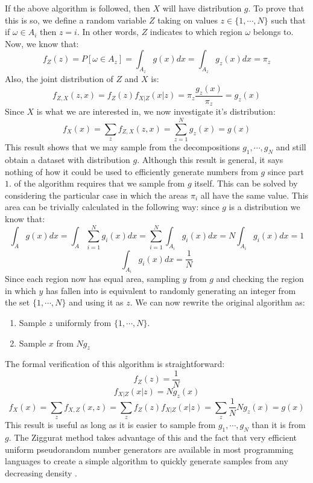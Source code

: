 \documentclass[11pt,onecolumn]{article}
\begin{document}
If the above algorithm is followed, then $X$ will have distribution $g$. To prove that this is so, we define a random variable $Z$ taking on values $z\in\{1,\dotsb,N\}$ such that if $\omega\in A_i$ then $z=i$. In other words, $Z$ indicates to which region $\omega$ belongs to. Now, we know that:
$$f_Z(z)=P[\omega\in A_z]=\int_{A_z} g(x)dx=\int_{A_z} g_z(x)dx=\pi_z$$
Also, the joint distribution of $Z$ and $X$ is:
$$f_{Z,X}(z,x)=f_Z(z)f_{X|Z}(x|z)=\pi_z\frac{g_z(x)}{\pi_z}=g_z(x)$$
Since $X$ is what we are interested in, we now investigate it's distribution:
$$f_X(x)=\sum_z f_{Z,X}(z,x)=\sum_{z=1}^N g_z(x)=g(x)$$ 
This result shows that we may sample from the decompositions $g_1,\dotsb,g_N$ and still obtain a dataset with distribution $g$. Although this result is general, it says nothing of how it could be used to efficiently generate numbers from $g$ since part $1.$ of the algorithm requires that we sample from $g$ itself. This can be solved by considering the particular case in which the areas $\pi_i$ all have the same value. This area can be trivially calculated in the following way: since $g$ is a distribution we know that:
$$\int_A g(x)dx=\int_A \sum_{i=1}^N g_i(x)dx=\sum_{i=1}^N \int_{A_i} g_i(x)dx=N\int_{A_i} g_i(x)dx=1$$
$$\int_{A_i} g_i(x)dx=\frac{1}{N}$$
Since each region now has equal area, sampling $y$ from $g$ and checking the region in which $y$ has fallen into is equivalent to randomly generating an integer from the set $\{1,\dotsb,N\}$ and using it as $z$. We can now rewrite the original algorithm as:
\begin{enumerate}
	\item Sample $z$ uniformly from $\{1,\dotsb,N\}$.
	\item Sample $x$ from $Ng_z$
\end{enumerate}
The formal verification of this algorithm is straightforward:
$$f_Z(z)=\frac{1}{N}$$
$$f_{X|Z}(x|z)=Ng_z(x)$$
$$f_X(x)=\sum_z f_{X,Z}(x,z) = \sum_z f_Z(z)f_{X|Z}(x|z)=\sum_z \frac{1}{N}Ng_z(x)=g(x)$$
This result is useful as long as it is easier to sample from $g_1,\dotsb,g_N$ than it is from $g$. The Ziggurat method takes advantage of this and the fact that very efficient uniform pseudorandom number generators are available in most programming languages to create a simple algorithm to quickly generate samples from any decreasing density \cite{marsaglia2000ziggurat}.

\newpage
\printbibliography
\end{document}
